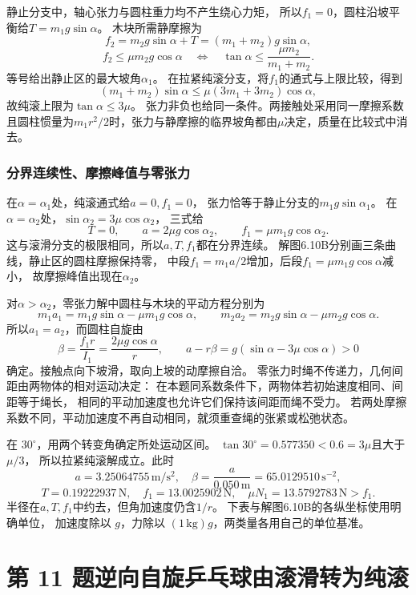 \documentclass[UTF8,fontset=fandol,a4paper,11pt]{ctexart}
\begin{document}
静止分支中，轴心张力与圆柱重力均不产生绕心力矩，
所以$f_1=0$，圆柱沿坡平衡给$T=m_1g\sin\alpha$。
木块所需静摩擦为
\[
f_2=m_2g\sin\alpha+T=(m_1+m_2)g\sin\alpha,
\]
\[
f_2\leq\mu m_2g\cos\alpha
\quad\Longleftrightarrow\quad
\tan\alpha\leq\frac{\mu m_2}{m_1+m_2}.
\]
等号给出静止区的最大坡角$\alpha_1$。
在拉紧纯滚分支，将$f_1$的通式与上限比较，得到
\[
(m_1+m_2)\sin\alpha
\leq\mu(3m_1+3m_2)\cos\alpha,
\]
故纯滚上限为$\tan\alpha\leq3\mu$。
张力非负也给同一条件。两接触处采用同一摩擦系数且圆柱惯量为$m_1r^2/2$时，张力与静摩擦的临界坡角都由$\mu$决定，质量在比较式中消去。

\subsubsection*{分界连续性、摩擦峰值与零张力}
在$\alpha=\alpha_1$处，纯滚通式给$a=0,f_1=0$，
张力恰等于静止分支的$m_1g\sin\alpha_1$。
在$\alpha=\alpha_2$处，$\sin\alpha_2=3\mu\cos\alpha_2$，
三式给
\[
T=0,\qquad a=2\mu g\cos\alpha_2,\qquad
f_1=\mu m_1g\cos\alpha_2.
\]
这与滚滑分支的极限相同，所以$a,T,f_1$都在分界连续。
解图6.10B分别画三条曲线，静止区的圆柱摩擦保持零，
中段$f_1=m_1a/2$增加，后段$f_1=\mu m_1g\cos\alpha$减小，
故摩擦峰值出现在$\alpha_2$。

对$\alpha>\alpha_2$，零张力解中圆柱与木块的平动方程分别为
\[
m_1a_1=m_1g\sin\alpha-\mu m_1g\cos\alpha,
\qquad
m_2a_2=m_2g\sin\alpha-\mu m_2g\cos\alpha.
\]
所以$a_1=a_2$，而圆柱自旋由
\[
\beta=\frac{f_1r}{I_1}=\frac{2\mu g\cos\alpha}{r},
\qquad a-r\beta=g(\sin\alpha-3\mu\cos\alpha)>0
\]
确定。接触点向下坡滑，取向上坡的动摩擦自洽。
零张力时绳不传递力，几何间距由两物体的相对运动决定：
在本题同系数条件下，两物体若初始速度相同、间距等于绳长，
相同的平动加速度也允许它们保持该间距而绳不受力。
若两处摩擦系数不同，平动加速度不再自动相同，就须重查绳的张紧或松弛状态。

在 $30^\circ$，用两个转变角确定所处运动区间。
$\tan30^\circ=0.577350<0.6=3\mu$且大于$\mu/3$，
所以拉紧纯滚解成立。此时
\[
a=3.25064755\,\mathrm{m/s^2},\quad
\beta=\frac a{0.050\,\mathrm m}=65.0129510\,\mathrm{s^{-2}},
\]
\[
T=0.19222937\,\mathrm N,\quad f_1=13.0025902\,\mathrm N,
\quad \mu N_1=13.5792783\,\mathrm N>f_1.
\]
半径在$a,T,f_1$中约去，但角加速度仍含$1/r$。
下表与解图6.10B的各纵坐标使用明确单位，
加速度除以 $g$，力除以 $(1\,\mathrm{kg})g$，两类量各用自己的单位基准。




\section*{第 11 题\quad 逆向自旋乒乓球由滚滑转为纯滚}
\end{document}
